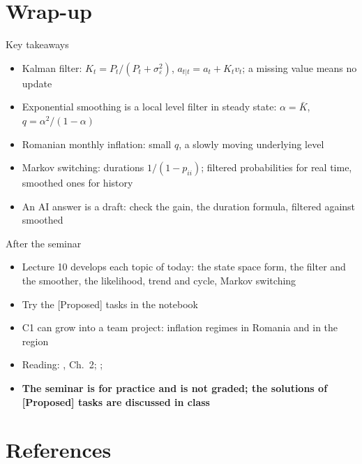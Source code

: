 \section{Wrap-up}

\begin{frame}{Key takeaways}
\itemsize{\small}
\begin{itemize}
    \item Kalman filter: $K_t = P_t/(P_t + \sigma^2_\varepsilon)$, $a_{t|t} = a_t + K_tv_t$; a missing value means no update
    \item Exponential smoothing is a local level filter in steady state: $\alpha = \bar K$, $q = \alpha^2/(1 - \alpha)$
    \item Romanian monthly inflation: small $q$, a slowly moving underlying level
    \item Markov switching: durations $1/(1 - p_{ii})$; filtered probabilities for real time, smoothed ones for history
    \item An AI answer is a draft: check the gain, the duration formula, filtered against smoothed
\end{itemize}
\end{frame}

\begin{frame}{After the seminar}
\itemsize{\small}
\begin{itemize}
    \item Lecture 10 develops each topic of today: the state space form, the filter and the smoother, the likelihood, trend and cycle, Markov switching
    \item Try the [Proposed] tasks in the notebook
    \item C1 can grow into a team project: inflation regimes in Romania and in the region
    \item Reading: , Ch.~2; ; 
    \item \textbf{The seminar is for practice and is not graded; the solutions of [Proposed] tasks are discussed in class}
\end{itemize}
\end{frame}


\section{References}

